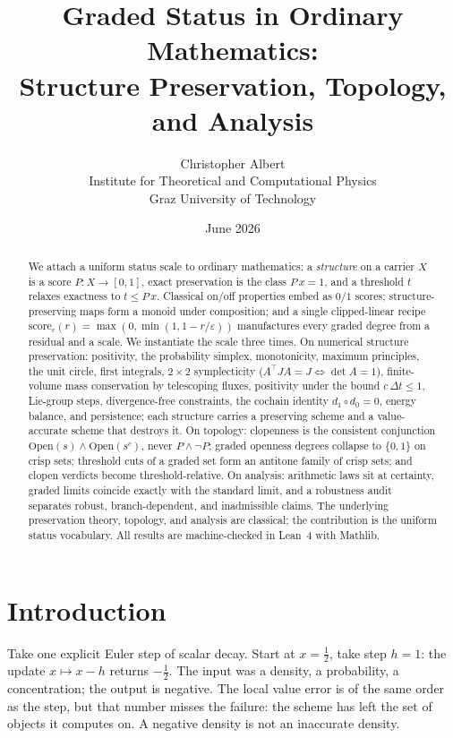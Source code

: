 \documentclass[11pt,a4paper]{article}
\title{Graded Status in Ordinary Mathematics:\\
Structure Preservation, Topology, and Analysis}
\author{Christopher Albert\\
\small Institute for Theoretical and Computational Physics\\
\small Graz University of Technology}
\date{June 2026}
\begin{document}
\maketitle

\begin{abstract}
We attach a uniform status scale to ordinary mathematics: a
\emph{structure} on a carrier $X$ is a score $P : X \to [0,1]$, exact
preservation is the class $P\,x = 1$, and a threshold $t$ relaxes
exactness to $t \le P\,x$.
Classical on/off properties embed as $0/1$ scores; structure-preserving
maps form a monoid under composition; and a single clipped-linear
recipe $\mathrm{score}_\varepsilon(r) = \max(0, \min(1, 1 - r/\varepsilon))$
manufactures every graded degree from a residual and a scale.
We instantiate the scale three times.
On numerical structure preservation: positivity, the probability simplex,
monotonicity, maximum principles, the unit circle, first integrals,
$2 \times 2$ symplecticity ($A^{\top} J A = J \iff \det A = 1$),
finite-volume mass conservation by telescoping fluxes, positivity under
the bound $c\,\Delta t \le 1$, Lie-group steps, divergence-free
constraints, the cochain identity $d_1 \circ d_0 = 0$, energy balance,
and persistence; each structure carries a preserving scheme and a
value-accurate scheme that destroys it.
On topology: clopenness is the consistent conjunction
$\mathrm{Open}(s) \wedge \mathrm{Open}(s^{c})$, never $P \wedge \neg P$;
graded openness degrees collapse to $\{0,1\}$ on crisp sets; threshold
cuts of a graded set form an antitone family of crisp sets; and
clopen verdicts become threshold-relative.
On analysis: arithmetic laws sit at certainty, graded limits coincide
exactly with the standard limit, and a robustness audit separates %
robust, branch-dependent, and inadmissible claims. %
The underlying preservation theory, topology, and analysis are
classical; the contribution is the uniform status vocabulary.
All results are machine-checked in Lean~4 with Mathlib.
\end{abstract}

\section{Introduction}
\label{sec:intro}

Take one explicit Euler step of scalar decay.
Start at $x = \tfrac{1}{2}$, take step $h = 1$: the update
$x \mapsto x - h$ returns $-\tfrac{1}{2}$.
The input was a density, a probability, a concentration; the output is
negative.
The local value error is of the same order as the step, but that number
misses the failure: the scheme has left the set of objects it computes
on.
A negative density is not an inaccurate density.
\end{document}
